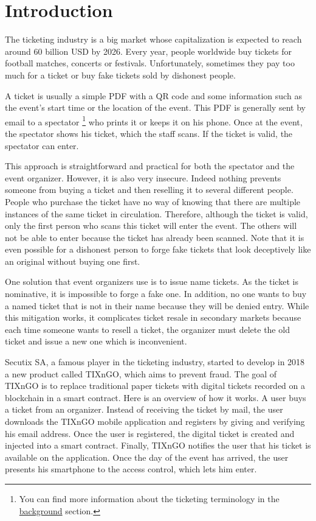 \documentclass[a4paper,11pt,oneside]{report}
\begin{document}
\maketoc

\chapter{Introduction}
The ticketing industry is a big market whose capitalization is expected to reach around 60 billion USD by 2026. Every year, people worldwide buy tickets for football matches, concerts or festivals. Unfortunately, sometimes they pay too much for a ticket or buy fake tickets sold by dishonest people.

A ticket is usually a simple PDF with a QR code and some information such as the event's start time or the location of the event. This PDF is generally sent by email to a spectator \footnote{You can find more information about the ticketing terminology in the  \hyperref[sec:ticketing_terminology]{background} section.} who prints it or keeps it on his phone. Once at the event, the spectator shows his ticket, which the staff scans. If the ticket is valid, the spectator can enter.

This approach is straightforward and practical for both the spectator and the event organizer. However, it is also very insecure. Indeed nothing prevents someone from buying a ticket and then reselling it to several different people. People who purchase the ticket have no way of knowing that there are multiple instances of the same ticket in circulation. Therefore, although the ticket is valid, only the first person who scans this ticket will enter the event. The others will not be able to enter because the ticket has already been scanned. Note that it is even possible for a dishonest person to forge fake tickets that look deceptively like an original without buying one first.

One solution that event organizers use is to issue name tickets. As the ticket is nominative, it is impossible to forge a fake one. In addition, no one wants to buy a named ticket that is not in their name because they will be denied entry. While this mitigation works, it complicates ticket resale in secondary markets because each time someone wants to resell a ticket, the organizer must delete the old ticket and issue a new one which is inconvenient.

Secutix SA, a famous player in the ticketing industry, started to develop in 2018 a new product called TIXnGO, which aims to prevent fraud. The goal of TIXnGO is to replace traditional paper tickets with digital tickets recorded on a blockchain in a smart contract. Here is an overview of how it works. A user buys a ticket from an organizer. Instead of receiving the ticket by mail, the user downloads the TIXnGO mobile application and registers by giving and verifying his email address. Once the user is registered, the digital ticket is created and injected into a smart contract. Finally, TIXnGO notifies the user that his ticket is available on the application. Once the day of the event has arrived, the user presents his smartphone to the access control, which lets him enter.
\end{document}
